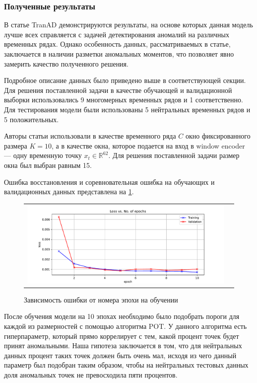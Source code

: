 \documentclass{article}
\begin{document}
\subsubsection{Полученные результаты}
В статье TranAD \citep{TranAD} демонстрируются результаты, на основе которых данная модель лучше всех справляется с задачей детектирования аномалий на различных временных рядах. Однако особенность данных, рассматриваемых в статье, заключается в наличии разметки аномальных моментов, что позволяет явно замерить качество полученного решения. 

Подробное описание данных было приведено выше в соответствующей секции. Для решения поставленной задачи в качестве обучающей и валидационной выборки использовались 9 многомерных временных рядов и 1 соответственно. Для тестирования модели были использованы 5 нейтральных временных рядов и 5 положительных. 

Авторы статьи использовали в качестве временного ряда $C$ окно фиксированного размера $K = 10$, а в качестве окна, которое подается на вход в window encoder --- одну временную точку $x_t \in \mathbb{R}^{62}$. Для решения поставленной задачи размер окна был выбран равным 15. 

Ошибка восстановления и соревновательная ошибка на обучающих и валидационных данных представлена на \ref{fig:mist}.

\begin{figure}[h]
\begin{tabular}{cc}
  \includegraphics[width=160mm]{7.pdf}
\end{tabular}
\caption{Зависимость ошибки от номера эпохи на обучении}
\label{fig:mist}
\end{figure}

После обучения модели на 10 эпохах необходимо было подобрать пороги для каждой из размерностей с помощью алгоритма POT. У данного алгоритма есть гиперпараметр, который прямо коррелирует с тем, какой процент точек будет принят аномальными. Наша гипотеза заключается в том, что для нейтральных данных процент таких точек должен быть очень мал, исходя из чего данный параметр был подобран таким образом, чтобы на нейтральных тестовых данных доля аномальных точек не превосходила пяти процентов. 
\end{document}
